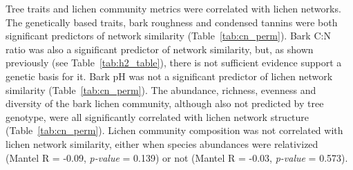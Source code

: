 \documentclass[11pt,twocolumn,twoside,lineno]{pnas-new}
\begin{document}
Tree traits and lichen community metrics were correlated with lichen
networks. The genetically based traits, bark roughness and condensed
tannins were both significant predictors of network similarity
(Table~\ref{tab:cn_perm}). Bark C:N ratio was also a significant
predictor of network similarity, but, as shown previously (see
Table~\ref{tab:h2_table}), there is not sufficient evidence support a
genetic basis for it. Bark pH was not a significant predictor of
lichen network similarity (Table~\ref{tab:cn_perm}). The abundance,
richness, evenness and diversity of the bark lichen community,
although also not predicted by tree genotype, were all significantly
correlated with lichen network structure
(Table~\ref{tab:cn_perm}). Lichen community composition was not
correlated with lichen network similarity, either when species
abundances were relativized (Mantel R = -0.09, \textit{p-value} =
0.139) or not (Mantel R = -0.03, \textit{p-value} = 0.573). 






\end{document}
